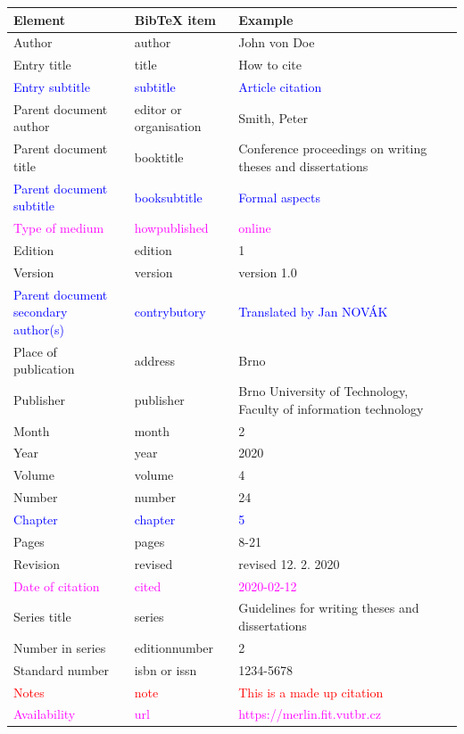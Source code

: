 \begin{tabularx}{\linewidth}{X X X}
    Element & BibTeX item & Example\\\hline
    Author & author & John von Doe\\
    Entry title & title & How to cite\\
    \textcolor{blue}{Entry subtitle} & \textcolor{blue}{subtitle} & \textcolor{blue}{Article citation}\\
    Parent document author & editor or organisation & Smith, Peter\\
    Parent document title & booktitle & Conference proceedings on writing theses and dissertations\\
    \textcolor{blue}{Parent document subtitle} & \textcolor{blue}{booksubtitle} & \textcolor{blue}{Formal aspects}\\
    \textcolor{magenta}{Type of medium} & \textcolor{magenta}{howpublished} & \textcolor{magenta}{online}\\
    Edition & edition & 1\\
    Version & version & version 1.0\\
    \textcolor{blue}{Parent document secondary author(s)} & \textcolor{blue}{contrybutory} & \textcolor{blue}{Translated by Jan NOVÁK}\\
    Place of publication & address & Brno\\
    Publisher & publisher & Brno University of Technology, Faculty of information technology\\
    Month & month & 2\\
    Year & year & 2020\\
    Volume & volume & 4\\
    Number & number & 24\\
    \textcolor{blue}{Chapter} & \textcolor{blue}{chapter} & \textcolor{blue}{5}\\
    Pages & pages & 8-21\\
    Revision & revised & revised 12. 2. 2020\\
    \textcolor{magenta}{Date of citation} & \textcolor{magenta}{cited} & \textcolor{magenta}{2020-02-12}\\
    Series title & series & Guidelines for writing theses and dissertations\\
    Number in series & editionnumber & 2\\
    Standard number & isbn or issn & 1234-5678\\
    \textcolor{red}{Notes} & \textcolor{red}{note} & \textcolor{red}{This is a made up citation}\\
    \textcolor{magenta}{Availability} & \textcolor{magenta}{url} & \textcolor{magenta}{https://merlin.fit.vutbr.cz}\\
\end{tabularx}

